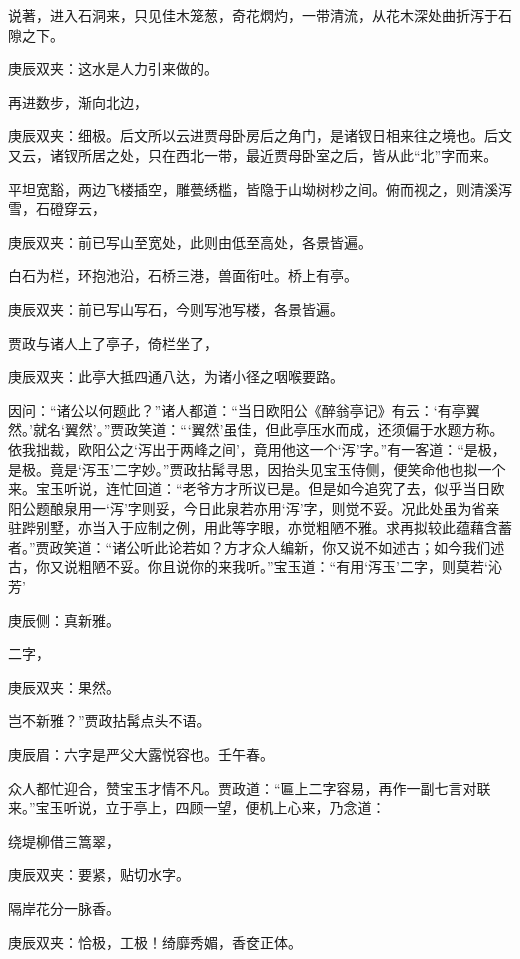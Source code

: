 \begin{parag}
    说著，进入石洞来，只见佳木笼葱，奇花熌灼，一带清流，从花木深处曲折泻于石隙之下。 \begin{note}庚辰双夹：这水是人力引来做的。\end{note} 再进数步，渐向北边， \begin{note}庚辰双夹：细极。后文所以云进贾母卧房后之角门，是诸钗日相来往之境也。后文又云，诸钗所居之处，只在西北一带，最近贾母卧室之后，皆从此“北”字而来。\end{note} 平坦宽豁，两边飞楼插空，雕甍绣槛，皆隐于山坳树杪之间。俯而视之，则清溪泻雪，石磴穿云， \begin{note}庚辰双夹：前已写山至宽处，此则由低至高处，各景皆遍。\end{note} 白石为栏，环抱池沿，石桥三港，兽面衔吐。桥上有亭。 \begin{note}庚辰双夹：前已写山写石，今则写池写楼，各景皆遍。\end{note} 贾政与诸人上了亭子，倚栏坐了， \begin{note}庚辰双夹：此亭大抵四通八达，为诸小径之咽喉要路。\end{note} 因问：“诸公以何题此？”诸人都道：“当日欧阳公《醉翁亭记》有云：‘有亭翼然。’就名‘翼然’。”贾政笑道：“‘翼然’虽佳，但此亭压水而成，还须偏于水题方称。依我拙裁，欧阳公之‘泻出于两峰之间’，竟用他这一个‘泻’字。”有一客道：“是极，是极。竟是‘泻玉’二字妙。”贾政拈髯寻思，因抬头见宝玉侍侧，便笑命他也拟一个来。宝玉听说，连忙回道：“老爷方才所议已是。但是如今追究了去，似乎当日欧阳公题酿泉用一‘泻’字则妥，今日此泉若亦用‘泻’字，则觉不妥。况此处虽为省亲驻跸别墅，亦当入于应制之例，用此等字眼，亦觉粗陋不雅。求再拟较此蕴藉含蓄者。”贾政笑道：“诸公听此论若如？方才众人编新，你又说不如述古；如今我们述古，你又说粗陋不妥。你且说你的来我听。”宝玉道：“有用‘泻玉’二字，则莫若‘沁芳’ \begin{note}庚辰侧：真新雅。\end{note} 二字， \begin{note}庚辰双夹：果然。\end{note} 岂不新雅？”贾政拈髯点头不语。 \begin{note}庚辰眉：六字是严父大露悦容也。壬午春。\end{note} 众人都忙迎合，赞宝玉才情不凡。贾政道：“匾上二字容易，再作一副七言对联来。”宝玉听说，立于亭上，四顾一望，便机上心来，乃念道：
\end{parag}


\begin{poem}
    \begin{pl}绕堤柳借三篙翠，\end{pl}
    \begin{note}庚辰双夹：要紧，贴切水字。\end{note}

    \begin{pl}隔岸花分一脉香。\end{pl}
    \begin{note}庚辰双夹：恰极，工极！绮靡秀媚，香奁正体。\end{note}
\end{poem}


